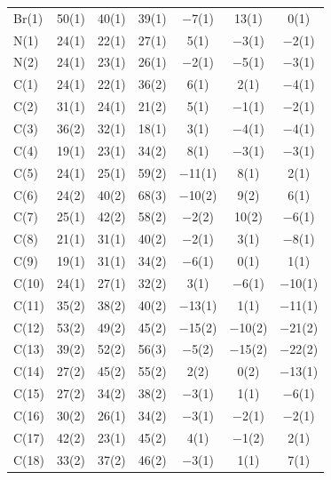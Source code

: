 \onecolumn
\begin{center}
\tablelasttail{\bottomrule}
{\footnotesize \singlespacing
\begin{supertabular}{lcccccc}
Br(1)&50(1) &40(1)&39(1) &$-$7(1)&13(1) &0(1)\\
N(1)&24(1) &22(1)&27(1) &5(1)&$-$3(1) &$-$2(1)\\
N(2)&24(1) &23(1)&26(1) &$-$2(1)&$-$5(1) &$-$3(1)\\
C(1)&24(1) &22(1)&36(2) &6(1)&2(1) &$-$4(1)\\
C(2)&31(1) &24(1)&21(2) &5(1)&$-$1(1) &$-$2(1)\\
C(3)&36(2) &32(1)&18(1) &3(1)&$-$4(1) &$-$4(1)\\
C(4)&19(1) &23(1)&34(2) &8(1)&$-$3(1) &$-$3(1)\\
C(5)&24(1) &25(1)&59(2) &$-$11(1)&8(1) &2(1)\\
C(6)&24(2) &40(2)&68(3) &$-$10(2)&9(2) &6(1)\\
C(7)&25(1) &42(2)&58(2) &$-$2(2)&10(2) &$-$6(1)\\
C(8)&21(1) &31(1)&40(2) &$-$2(1)&3(1) &$-$8(1)\\
C(9)&19(1) &31(1)&34(2) &$-$6(1)&0(1) &1(1)\\
C(10)&24(1) &27(1)&32(2) &3(1)&$-$6(1) &$-$10(1)\\
C(11)&35(2) &38(2)&40(2) &$-$13(1)&1(1) &$-$11(1)\\
C(12)&53(2) &49(2)&45(2) &$-$15(2)&$-$10(2) &$-$21(2)\\
C(13)&39(2) &52(2)&56(3) &$-$5(2)&$-$15(2) &$-$22(2)\\
C(14)&27(2) &45(2)&55(2) &2(2)&0(2) &$-$13(1)\\
C(15)&27(2) &34(2)&38(2) &$-$3(1)&1(1) &$-$6(1)\\
C(16)&30(2) &26(1)&34(2) &$-$3(1)&$-$2(1) &$-$2(1)\\
C(17)&42(2) &23(1)&45(2) &4(1)&$-$1(2) &2(1)\\
C(18)&33(2) &37(2)&46(2) &$-$3(1)&1(1) &7(1)\\

\end{supertabular}}
\end{center}
